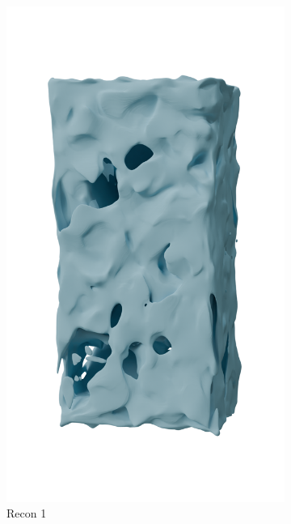 \begin{figure}[htb]
\begin{subfigure}{0.19\textwidth}
            \includegraphics[width=\linewidth]{figures/inr_cabinet/cabi_inr5.png}
            \caption{Recon 1}
        \end{subfigure}
        \hfill
        \begin{subfigure}{0.19\textwidth}

\end{subfigure}
\end{figure}
